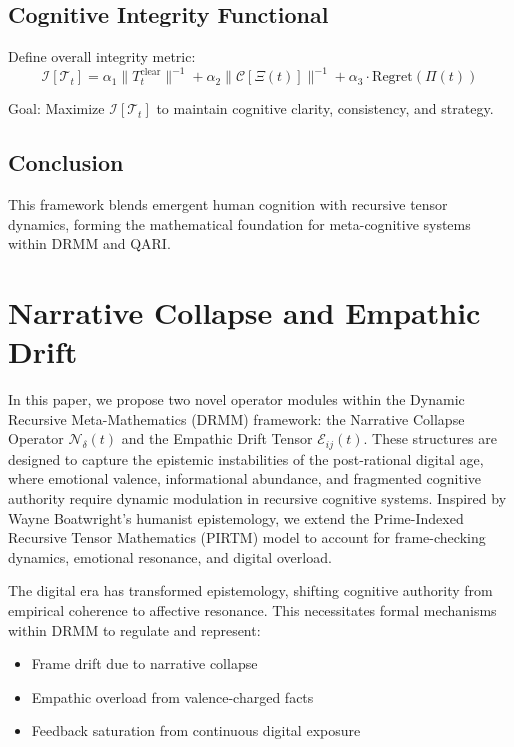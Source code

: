 \documentclass[12pt]{article}
\begin{document}
\subsection{Cognitive Integrity Functional}

Define overall integrity metric:
\begin{equation}
\mathcal{I}[\mathcal{T}_t] = \alpha_1 \|T_t^{\text{clear}}\|^{-1} + \alpha_2 \|\mathcal{C}[\Xi(t)]\|^{-1} + \alpha_3 \cdot \text{Regret}(\Pi(t))
\end{equation}

Goal: Maximize $\mathcal{I}[\mathcal{T}_t]$ to maintain cognitive clarity, consistency, and strategy.

\subsection*{Conclusion}
This framework blends emergent human cognition with recursive tensor dynamics, forming the mathematical foundation for meta-cognitive systems within DRMM and QARI.

\section{Narrative Collapse and Empathic Drift}

In this paper, we propose two novel operator modules within the Dynamic Recursive Meta-Mathematics (DRMM) framework: the Narrative Collapse Operator $\mathcal{N}_\delta(t)$ and the Empathic Drift Tensor $\mathcal{E}_{ij}(t)$. These structures are designed to capture the epistemic instabilities of the post-rational digital age, where emotional valence, informational abundance, and fragmented cognitive authority require dynamic modulation in recursive cognitive systems. Inspired by Wayne Boatwright's humanist epistemology, we extend the Prime-Indexed Recursive Tensor Mathematics (PIRTM) model to account for frame-checking dynamics, emotional resonance, and digital overload.

The digital era has transformed epistemology, shifting cognitive authority from empirical coherence to affective resonance. This necessitates formal mechanisms within DRMM to regulate and represent:
\begin{itemize}
  \item Frame drift due to narrative collapse
  \item Empathic overload from valence-charged facts
  \item Feedback saturation from continuous digital exposure
\end{itemize}
\end{document}
